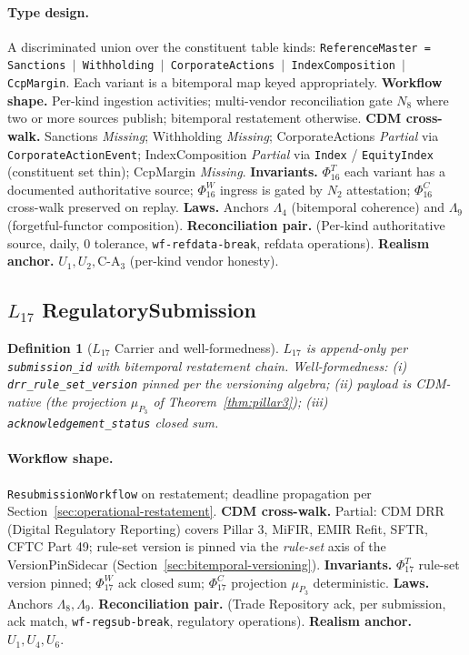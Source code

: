 \documentclass[11pt,a4paper]{article}
\newtheorem{definition}{Definition}[section]
\begin{document}
\paragraph{Type design.} A discriminated union over the constituent table kinds: \texttt{ReferenceMaster = Sanctions \(|\) Withholding \(|\) CorporateActions \(|\) IndexComposition \(|\) CcpMargin}. Each variant is a bitemporal map keyed appropriately. \textbf{Workflow shape.} Per-kind ingestion activities; multi-vendor reconciliation gate $N_8$ where two or more sources publish; bitemporal restatement otherwise. \textbf{CDM cross-walk.} Sanctions \emph{Missing}; Withholding \emph{Missing}; CorporateActions \emph{Partial} via \texttt{CorporateActionEvent}; IndexComposition \emph{Partial} via \texttt{Index} / \texttt{EquityIndex} (constituent set thin); CcpMargin \emph{Missing}. \textbf{Invariants.} $\Phi_{16}^T$ each variant has a documented authoritative source; $\Phi_{16}^W$ ingress is gated by $N_2$ attestation; $\Phi_{16}^C$ cross-walk preserved on replay. \textbf{Laws.} Anchors $\Lambda_4$ (bitemporal coherence) and $\Lambda_9$ (forgetful-functor composition). \textbf{Reconciliation pair.} (Per-kind authoritative source, daily, 0 tolerance, \texttt{wf-refdata-break}, refdata operations). \textbf{Realism anchor.} $U_1, U_2, \mathrm{C\textrm{-}A}_3$ (per-kind vendor honesty).

\subsection{$L_{17}$ RegulatorySubmission}
\label{sec:leaf-l17}

\begin{definition}[$L_{17}$ Carrier and well-formedness]
$L_{17}$ is append-only per \texttt{submission\_id} with bitemporal restatement chain. Well-formedness: (i) \texttt{drr\_rule\_set\_version} pinned per the versioning algebra; (ii) payload is CDM-native (the projection $\mu_{P_3}$ of Theorem~\ref{thm:pillar3}); (iii) \texttt{acknowledgement\_status} closed sum.
\end{definition}

\paragraph{Workflow shape.} \texttt{ResubmissionWorkflow} on restatement; deadline propagation per Section~\ref{sec:operational-restatement}. \textbf{CDM cross-walk.} Partial: CDM DRR (Digital Regulatory Reporting) covers Pillar 3, MiFIR, EMIR Refit, SFTR, CFTC Part 49; rule-set version is pinned via the \emph{rule-set} axis of the VersionPinSidecar (Section~\ref{sec:bitemporal-versioning}). \textbf{Invariants.} $\Phi_{17}^T$ rule-set version pinned; $\Phi_{17}^W$ ack closed sum; $\Phi_{17}^C$ projection $\mu_{P_3}$ deterministic. \textbf{Laws.} Anchors $\Lambda_8, \Lambda_9$. \textbf{Reconciliation pair.} (Trade Repository ack, per submission, ack match, \texttt{wf-regsub-break}, regulatory operations). \textbf{Realism anchor.} $U_1, U_4, U_6$.
\end{document}
